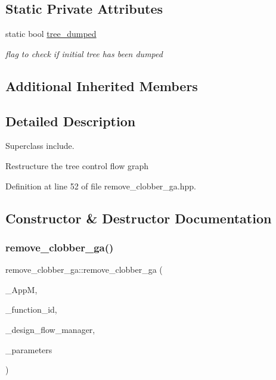 \subsection*{Static Private Attributes}
\begin{DoxyCompactItemize}
\item 
static bool \hyperlink{classremove__clobber__ga_af02dd1c15ea8649ab34a24bde174968c}{tree\+\_\+dumped}
\begin{DoxyCompactList}\small\item\em flag to check if initial tree has been dumped \end{DoxyCompactList}\end{DoxyCompactItemize}
\subsection*{Additional Inherited Members}


\subsection{Detailed Description}
Superclass include. 

Restructure the tree control flow graph 

Definition at line 52 of file remove\+\_\+clobber\+\_\+ga.\+hpp.



\subsection{Constructor \& Destructor Documentation}
\mbox{\label{classremove__clobber__ga_a0cb33caf4a52b3b9437463533669f1c1}} 
\subsubsection{\texorpdfstring{remove\+\_\+clobber\+\_\+ga()}{remove\_clobber\_ga()}}
{\footnotesize\ttfamily remove\+\_\+clobber\+\_\+ga\+::remove\+\_\+clobber\+\_\+ga (\begin{DoxyParamCaption}\item[{const \hyperlink{application__manager_8hpp_a04ccad4e5ee401e8934306672082c180}{application\+\_\+manager\+Ref}}]{\+\_\+\+AppM,  }\item[{unsigned int}]{\+\_\+function\+\_\+id,  }\item[{const Design\+Flow\+Manager\+Const\+Ref}]{\+\_\+design\+\_\+flow\+\_\+manager,  }\item[{const \hyperlink{Parameter_8hpp_a37841774a6fcb479b597fdf8955eb4ea}{Parameter\+Const\+Ref}}]{\+\_\+parameters }\end{DoxyParamCaption})}



